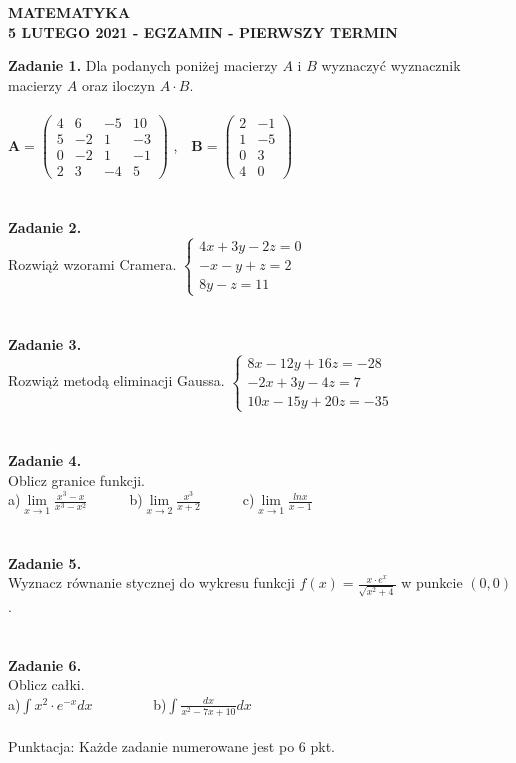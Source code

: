 \documentclass[12pt,a4paper]{report}
\begin{document}
\begin{center}

\textbf{MATEMATYKA \\5 LUTEGO 2021 - EGZAMIN - PIERWSZY TERMIN}

\end{center}\textbf{Zadanie 1.} Dla podanych poniżej macierzy $A$ i $B$ wyznaczyć wyznacznik macierzy $A$ oraz iloczyn $A\cdot B$. \\\\ $ \mathbf{A} = \left( \begin{array}{cccc} 4 & 6& -5 & 10\\5 & -2& 1 & -3\\0 & -2& 1 & -1\\2 & 3 & -4 & 5 \end{array} \right)$ ,\ \ $\mathbf{B} =\left( \begin{array}{cccc}2 & -1\\1 & -5\\0 & 3\\4 & 0  \end{array} \right)$\\\\\\\textbf{Zadanie 2.} \\Rozwiąż wzorami Cramera. $\left\{ \begin{array}{ll}4x+3y-2z=0\\-x-y+z=2\\8y-z=11\end{array} \right.$\\\\\\\textbf{Zadanie 3.} \\Rozwiąż metodą eliminacji Gaussa. $\left\{ \begin{array}{ll}8x-12y+16z=-28\\-2x+3y-4z=7\\10x-15y+20z=-35\end{array} \right.$\\\\\\\textbf{Zadanie 4.}\\Oblicz granice funkcji.\\a)$\lim\limits_{x\to 1}\frac{x^3-x}{x^3-x^2}$\ \ \ \ \ \  b)$\lim\limits_{x\to 2}\frac{x^3}{x+2}$\ \ \ \ \ \ c)$\lim\limits_{x\to 1} \frac{lnx}{x-1}$\\\\\\\textbf{Zadanie 5.} \\Wyznacz równanie stycznej do wykresu funkcji $f(x)=\frac{x\cdot e^x}{\sqrt{x^2+4}}$ w punkcie $(0,0)$.\\\\\\\textbf{Zadanie 6.} \\Oblicz całki. \\a)$\int x^2\cdot e^{-x} dx$ \ \ \ \ \ \ \ \ b)$\int \frac{dx}{x^2-7x+10} dx$\\\\Punktacja: Każde zadanie numerowane jest po 6 pkt.
\end{document}
